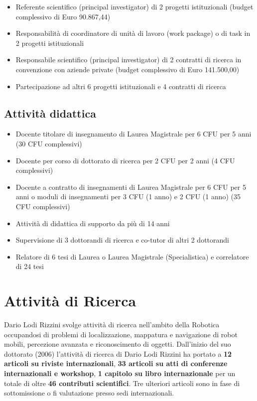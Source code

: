 \documentclass[11pt]{article}
\begin{document}
\begin{itemize}
\item Referente scientifico (principal investigator) di 2 progetti istituzionali (budget complessivo di Euro 90.867,44)
\item Responsabilit\`a di coordinatore di unit\`a di lavoro (work package) o di task in 2 progetti istituzionali
\item Responsabile scientifico (principal investigator) di 2 contratti di ricerca in convenzione con aziende private (budget complessivo di Euro 141.500,00)
\item Partecipazione ad altri 6 progetti istituzionali e 4 contratti di ricerca
\end{itemize}


\subsection*{Attivit\`a didattica}

\begin{itemize}
\item Docente titolare di insegnamento di Laurea Magistrale per 6 CFU per 5 anni (30 CFU complessivi)
\item Docente per corso di dottorato di ricerca per 2 CFU per 2 anni (4 CFU complessivi) 
\item Docente a contratto di insegnamenti di Laurea Magistrale per 6 CFU per 5 anni o moduli di insegnamenti per 3 CFU (1 anno) e 2 CFU (1 anno) (35 CFU complessivi) 
\item Attivit\`a di didattica di supporto da pi\`u di 14 anni
\item Supervisione di 3 dottorandi di ricerca e co-tutor di altri 2 dottorandi
\item Relatore di 6 tesi di Laurea o Laurea Magistrale (Specialistica) e correlatore di 24 tesi
\end{itemize}



\section{Attivit\`a di Ricerca}

Dario Lodi Rizzini svolge attivit\`a di ricerca nell'ambito della Robotica occupandosi di problemi di localizzazione, mappatura e navigazione di robot mobili, percezione avanzata e riconoscimento di oggetti.
Dall'inizio del suo dottorato (2006) l'attivit\`a di ricerca di Dario Lodi Rizzini ha portato a 
\textbf{12 articoli su riviste internazionali}, 
\textbf{33 articoli su atti di conferenze internazionali e workshop},
\textbf{1 capitolo su libro internazionale} 
per un totale di oltre \textbf{46 contributi scientifici}.
Tre ulteriori articoli sono in fase di sottomissione o fi valutazione presso sedi internazionali.
 
\end{document}
